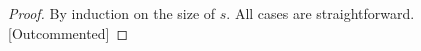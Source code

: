 \documentclass{lmcs}
\theoremstyle{theorem}\newtheorem{theorem}{Theorem}
\theoremstyle{theorem}\newtheorem{lemma}[theorem]{Lemma}
\theoremstyle{theorem}\newtheorem{corollary}[theorem]{Corollary}
\theoremstyle{definition}\newtheorem{definition}[theorem]{Definition}
\theoremstyle{definition}\newtheorem{example}[theorem]{Example}
\newcommand{\Vfree}{\mathcal{V}_{\mathit{nonb}}}
\newcommand{\Vbound}{\mathcal{V}_{\mathit{binder}}}
\newcommand{\FV}{\mathit{FV}}
\newcommand{\identifier}[1]{\mathtt{#1}}
\newcommand{\afun}{\identifier{f}}
\newcommand{\avar}{x}
\newcommand{\bvar}{y}
\newcommand{\Bvar}{Y}
\newcommand{\abs}[2]{\lambda #1.#2}
\newcommand{\meta}[2]{#1\langle#2\rangle}
\newcommand{\tuple}[2]{\llparenthesis #1,\dots,#2 \rrparenthesis}
\begin{document}
\begin{proof}
By induction on the size of $s$.
All cases are straightforward. [Outcommented]
\end{proof}
\end{document}
